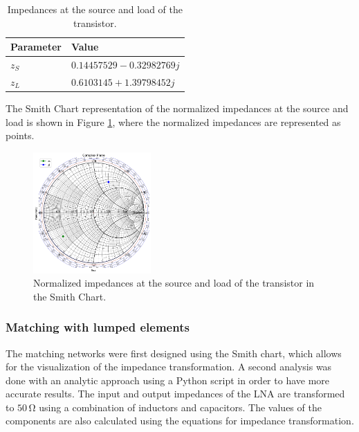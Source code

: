 \begin{table}[H]
    \centering
    \caption{Impedances at the source and load of the transistor.}
    \begin{tabularx}{\textwidth}{>{\centering\arraybackslash}X >{\centering\arraybackslash}X}
        \toprule
        \textbf{Parameter} & \textbf{Value} \\
        \midrule
        $z_{S}$     & $0.14457529-0.32982769j$ \\
        \midrule
        $z_{L}$     & $0.6103145+1.39798452j$\\
        \bottomrule
    \end{tabularx}
    \label{tab:Impedances}
\end{table}

The Smith Chart representation of the normalized impedances at the source and load is shown in Figure \ref{fig:ZsZl}, where the normalized impedances are represented as points.
\begin{figure}[H]
    \centering
    \includegraphics[width=0.4\textwidth]{Images/ZsZl-smithChart.png}
    \caption{Normalized impedances at the source and load of the transistor in the Smith Chart.}
    \label{fig:ZsZl}
\end{figure}

\subsubsection{Matching with lumped elements}

The matching networks were first designed using the Smith chart, which allows for the visualization of the impedance transformation. A second analysis was done with an analytic approach using a Python script in order to have more accurate results. The input and output impedances of the LNA are transformed to $50\,\si{\ohm}$ using a combination of inductors and capacitors. The values of the components are also calculated using the equations for impedance transformation. 

